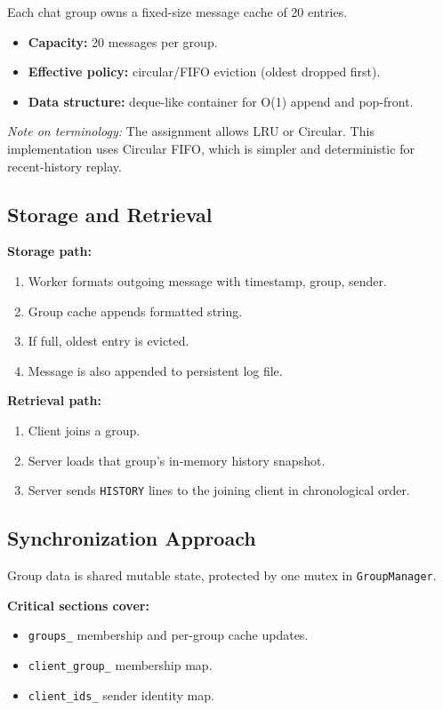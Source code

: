 \documentclass[12pt,letterpaper]{article}
\begin{document}
Each chat group owns a fixed-size message cache of 20 entries.

\begin{itemize}[leftmargin=1.5em]
  \item \textbf{Capacity:} 20 messages per group.
  \item \textbf{Effective policy:} circular/FIFO eviction (oldest dropped first).
  \item \textbf{Data structure:} deque-like container for O(1) append and pop-front.
\end{itemize}

\medskip
\noindent\textit{Note on terminology:} The assignment allows LRU or Circular.
This implementation uses Circular FIFO, which is simpler and deterministic for
recent-history replay.

\subsection{Storage and Retrieval}

\noindent\textbf{Storage path:}
\begin{enumerate}[leftmargin=1.5em]
  \item Worker formats outgoing message with timestamp, group, sender.
  \item Group cache appends formatted string.
  \item If full, oldest entry is evicted.
  \item Message is also appended to persistent log file.
\end{enumerate}

\noindent\textbf{Retrieval path:}
\begin{enumerate}[leftmargin=1.5em]
  \item Client joins a group.
  \item Server loads that group's in-memory history snapshot.
  \item Server sends \texttt{HISTORY} lines to the joining client in chronological order.
\end{enumerate}

\subsection{Synchronization Approach}

Group data is shared mutable state, protected by one mutex in \texttt{GroupManager}.

\medskip
\noindent\textbf{Critical sections cover:}
\begin{itemize}[leftmargin=1.5em]
  \item \texttt{groups\_} membership and per-group cache updates.
  \item \texttt{client\_group\_} membership map.
  \item \texttt{client\_ids\_} sender identity map.
\end{itemize}
\end{document}
